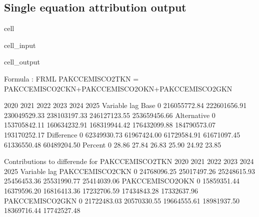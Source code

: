 \documentclass[letterpaper,10pt,english]{jupyterBook}
\begin{document}
\subsection{Single equation attribution output}
\label{\detokenize{content/howto/attribution/Attribution background:single-equation-attribution-output}}
\begin{sphinxuseclass}{cell}\begin{sphinxVerbatimInput}

\begin{sphinxuseclass}{cell_input}
\begin{sphinxVerbatim}[commandchars=\\\{\}]
 
    \PYG{p}{[}\PYG{p}{]}
\end{sphinxVerbatim}

\end{sphinxuseclass}\end{sphinxVerbatimInput}
\begin{sphinxVerbatimOutput}

\begin{sphinxuseclass}{cell_output}
\begin{sphinxVerbatim}[commandchars=\\\{\}]
Formula        : FRML  \PYGZlt{}\PYGZgt{} PAKCCEMISCO2TKN = PAKCCEMISCO2CKN+PAKCCEMISCO2OKN+PAKCCEMISCO2GKN \PYGZdl{} 

                        2020         2021         2022         2023         2024         2025
Variable    lag                                                                              
Base        0   216055772.84 222601656.91 230049529.33 238103197.33 246127123.55 253659456.66
Alternative 0   153705842.11 160634232.91 168319944.42 176432099.88 184790573.07 193170252.17
Difference  0   \PYGZhy{}62349930.73 \PYGZhy{}61967424.00 \PYGZhy{}61729584.91 \PYGZhy{}61671097.45 \PYGZhy{}61336550.48 \PYGZhy{}60489204.50
Percent     0         \PYGZhy{}28.86       \PYGZhy{}27.84       \PYGZhy{}26.83       \PYGZhy{}25.90       \PYGZhy{}24.92       \PYGZhy{}23.85

 Contributions to differende for  PAKCCEMISCO2TKN
                            2020         2021         2022         2023         2024         2025
Variable        lag                                                                              
PAKCCEMISCO2CKN 0   \PYGZhy{}24768096.25 \PYGZhy{}25017497.26 \PYGZhy{}25248615.93 \PYGZhy{}25456453.36 \PYGZhy{}25531990.77 \PYGZhy{}25414039.06
PAKCCEMISCO2OKN 0   \PYGZhy{}15859351.44 \PYGZhy{}16379596.20 \PYGZhy{}16816413.36 \PYGZhy{}17232706.59 \PYGZhy{}17434843.28 \PYGZhy{}17332637.96
PAKCCEMISCO2GKN 0   \PYGZhy{}21722483.03 \PYGZhy{}20570330.55 \PYGZhy{}19664555.61 \PYGZhy{}18981937.50 \PYGZhy{}18369716.44 \PYGZhy{}17742527.48


\end{sphinxVerbatim}
\end{sphinxuseclass}
\end{sphinxVerbatimOutput}
\end{sphinxuseclass}
\end{document}
